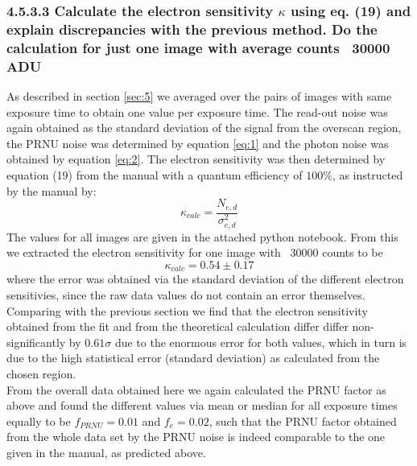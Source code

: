\subsubsection{4.5.3.3 Calculate the electron sensitivity $\kappa$ using eq. (19) and explain discrepancies with the previous method. Do the calculation for just one image with average counts ~30000 ADU}

As described in section \ref{sec:5} we averaged over the pairs of images with same exposure time to obtain one value per exposure time. The read-out noise was again obtained as the standard deviation of the signal from the overscan region, the PRNU noise was determined by equation \ref{eq:1} and the photon noise was obtained by equation \ref{eq:2}. The electron sensitivity was then determined by equation (19) from the manual with a quantum efficiency of $100 \%$, as instructed by the manual by:
\begin{equation}
	\kappa_{calc} = \frac{N_{e,d}}{\sigma_{e,d}^{2}}
\end{equation}
\noindent
The values for all images are given in the attached python notebook. From this we extracted the electron sensitivity for one image with ~30000 counts to be 
\[\kappa_{calc} =  0.54 \pm 0.17\]
\noindent
where the error was obtained via the standard deviation of the different electron sensitivies, since the raw data values do not contain an error themselves. Comparing with the previous section we find that the electron sensitivity obtained from the fit and from the theoretical calculation differ differ non-significantly by $0.61 \sigma$ due to the enormous error for both values, which in turn is due to the high statistical error (standard deviation) as calculated from the chosen region.\\
From the overall data obtained here we again calculated the PRNU factor as above and found the different values via mean or median for all exposure times equally to be $f_{PRNU}=0.01$ and $f_e = 0.02$, such that the PRNU factor obtained from the whole data set by the PRNU noise is indeed comparable to the one given in the manual, as predicted above.

